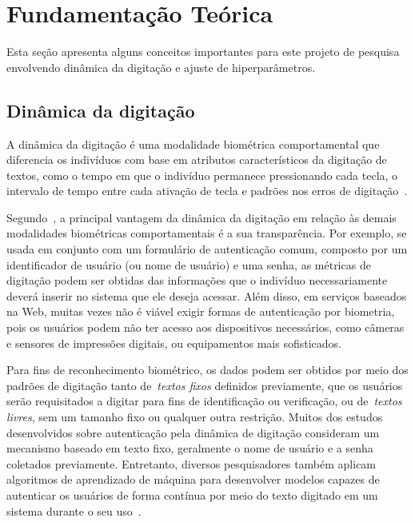 \section{Fundamentação Teórica}\label{sec:fundamentacao_teorica}

Esta seção apresenta alguns conceitos importantes para este projeto de pesquisa envolvendo dinâmica da digitação e ajuste de hiperparâmetros.


\subsection{Dinâmica da digitação}\label{subsec:dinamica_de_digitacao}

A dinâmica da digitação é uma modalidade biométrica comportamental que diferencia os indivíduos com base em atributos característicos da digitação de textos, como o tempo em que o indivíduo permanece pressionando cada tecla, o intervalo de tempo entre cada ativação de tecla e padrões nos erros de digitação~\cite{biometric_personal_auth_using_keystroke_dynamics}.

Segundo~, a principal vantagem da dinâmica da digitação em relação às demais modalidades biométricas comportamentais é a sua transparência. Por exemplo, se usada em conjunto com um formulário de autenticação comum, composto por um identificador de usuário (ou nome de usuário) e uma senha, as métricas de digitação podem ser obtidas das informações que o indivíduo necessariamente deverá inserir no sistema que ele deseja acessar. Além disso, em serviços baseados na Web, muitas vezes não é viável exigir formas de autenticação por biometria, pois os usuários podem não ter acesso aos dispositivos necessários, como câmeras e sensores de impressões digitais, ou equipamentos mais sofisticados.

Para fins de reconhecimento biométrico, os dados podem ser obtidos por meio dos padrões de digitação tanto de~\textit{textos fixos} definidos previamente, que os usuários serão requisitados a digitar para fins de identificação ou verificação, ou de~\textit{textos livres}, sem um tamanho fixo ou qualquer outra restrição. Muitos dos estudos desenvolvidos sobre autenticação pela dinâmica de digitação consideram um mecanismo baseado em texto fixo, geralmente o nome de usuário e a senha coletados previamente. Entretanto, diversos pesquisadores também aplicam algoritmos de aprendizado de máquina para desenvolver modelos capazes de autenticar os usuários de forma contínua por meio do texto digitado em um sistema durante o seu uso~\cite{continuous_auth_by_free_text_keystroke_based_on_cnn_and_rnn}.


